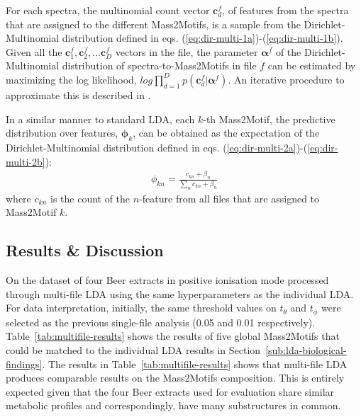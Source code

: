 For each spectra, the multinomial count vector $\textbf{c}_d^f$, of features from the spectra that are assigned to the different Mass2Motifs, is a sample from the Dirichlet-Multinomial distribution defined in eqs. (\ref{eq:dir-multi-1a})-(\ref{eq:dir-multi-1b}). Given all the $\textbf{c}_1^f,\textbf{c}_2^f, ... \textbf{c}_D^f$ vectors in the file, the parameter $\boldsymbol{\alpha}^f$ of the Dirichlet-Multinomial distribution of spectra-to-Mass2Motifs in file $f$ can be estimated by maximizing the log likelihood, $log\prod_{d=1}^{D}  p(\boldsymbol{c}_{d}^f \vert \boldsymbol{\alpha}^f)$. An iterative procedure to approximate this is described in \cite{Minka2003}.

In a similar manner to standard LDA, each $k$-th Mass2Motif, the predictive distribution over features, $\boldsymbol{\phi}_k$, can be obtained as the expectation of the Dirichlet-Multinomial distribution defined in eqs. (\ref{eq:dir-multi-2a})-(\ref{eq:dir-multi-2b}):
\begin{align}
{\phi}_{kn} = \frac{c_{kn}+{\beta}_n}{\sum_{n} c_{kn}+{\beta}_n}
\end{align}
where $c_{kn}$ is the count of the $n$-feature from all files that are assigned to Mass2Motif $k$. 

\subsection{Results \& Discussion}

On the dataset of four Beer extracts in positive ionisation mode processed through multi-file LDA using the same hyperparameters as the individual LDA. For data interpretation, initially, the same threshold values on $t_{\theta}$ and $t_{\phi}$ were selected as the previous single-file analysis (0.05 and 0.01 respectively). Table~\ref{tab:multifile-results} shows the results of five global Mass2Motifs that could be matched to the individual LDA results in Section~\ref{sub:lda-biological-findings}. The results in Table~\ref{tab:multifile-results} shows that multi-file LDA produces comparable results on the Mass2Motifs composition. This is entirely expected given that the four Beer extracts used for evaluation share similar metabolic profiles and correspondingly, have many substructures in common. 

